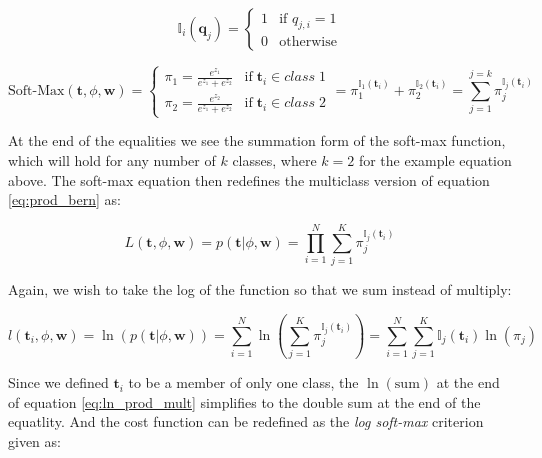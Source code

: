 \documentclass[11pt]{article}
\begin{document}
\begin{equation}
  \mathbb{I}_{i}\left(\mathbf{q}_{j}\right) =
  \begin{cases}
    1 & \text{if } q_{j,i} = 1\\
    0 & \text{otherwise}
  \end{cases}
\end{equation}

\begin{equation}\label{eq:softmax}
  \text{Soft-Max}\left(\mathbf{t},\phi,\mathbf{w}\right) = 
  \begin{cases}
    \pi_{1} = \frac{e^{z_{1}}}{e^{z_{1}} + e^{z_{2}}} & \mathrm{if\;}\mathbf{t}_{i}\in class\;1\\
    \pi_{2} = \frac{e^{z_{2}}}{e^{z_{1}} + e^{z_{2}}} & \mathrm{if\;}\mathbf{t}_{i}\in class\;2
  \end{cases}
  =
  \pi^{\mathbb{I}_{1}(\mathbf{t}_{i})}_{1} + \pi^{\mathbb{I}_{2}(\mathbf{t}_{i})}_{2}
  = \sum_{j=1}^{j=k}\pi^{\mathbb{I}_{j}(\mathbf{t}_{i})}_{j}
\end{equation}

At the end of the equalities we see the summation form of the soft-max function, which will hold for any number of $k$ classes, where $k = 2$ for the example equation above. The soft-max equation then redefines the multiclass version of equation \ref{eq:prod_bern} as:

\begin{equation}\label{eq:prod_mult}
  L\left(\mathbf{t},\phi,\mathbf{w}\right) = p\left(\mathbf{t} | \phi, \mathbf{w}\right) = \prod_{i=1}^{N} \sum_{j=1}^{K}\pi_{j}^{\mathbb{I}_{j}\left(\mathbf{t}_{i}\right)}
\end{equation}

Again, we wish to take the log of the function so that we sum instead of multiply:

\begin{equation}\label{eq:ln_prod_mult}
  l\left(\mathbf{t}_{i},\phi,\mathbf{w}\right) = \ln\left(p\left(\mathbf{t}|\phi,\mathbf{w}\right)\right) = \sum_{i = 1}^{N}\ln\left(\sum_{j=1}^{K}\pi_{j}^{\mathbb{I}_{j}\left(\mathbf{t}_{i}\right)}\right) = \sum_{i=1}^{N}  \sum_{j=1}^{K} \mathbb{I}_{j}\left(\mathbf{t}_{i}\right) \ln\left(\pi_{j}\right)
\end{equation}

Since we defined $\mathbf{t}_{i}$ to be a member of only one class, the $\ln\left(\text{sum}\right)$ at the end of equation \ref{eq:ln_prod_mult} simplifies to the double sum at the end of the equatlity. And the cost function can be redefined as the \emph{log soft-max} criterion given as:
\end{document}
